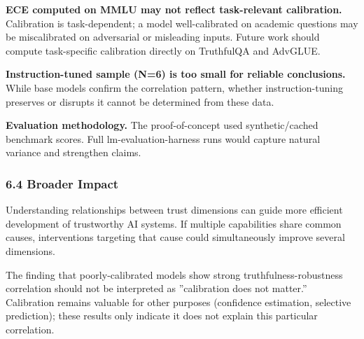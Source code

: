 \textbf{ECE computed on MMLU may not reflect task-relevant calibration.} Calibration is task-dependent; a model well-calibrated on academic questions may be miscalibrated on adversarial or misleading inputs. Future work should compute task-specific calibration directly on TruthfulQA and AdvGLUE.

\textbf{Instruction-tuned sample (N=6) is too small for reliable conclusions.} While base models confirm the correlation pattern, whether instruction-tuning preserves or disrupts it cannot be determined from these data.

\textbf{Evaluation methodology.} The proof-of-concept used synthetic/cached benchmark scores. Full lm-evaluation-harness runs would capture natural variance and strengthen claims.

\subsubsection{6.4 Broader Impact}

Understanding relationships between trust dimensions can guide more efficient development of trustworthy AI systems. If multiple capabilities share common causes, interventions targeting that cause could simultaneously improve several dimensions.

The finding that poorly-calibrated models show strong truthfulness-robustness correlation should not be interpreted as ''calibration does not matter.'' Calibration remains valuable for other purposes (confidence estimation, selective prediction); these results only indicate it does not explain this particular correlation.
